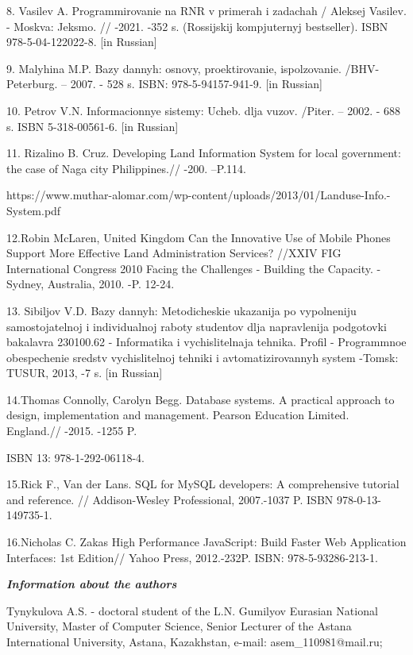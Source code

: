 8. Vasil\textquotesingle ev A. Programmirovanie na RNR v primerah i
zadachah / Aleksej Vasil\textquotesingle ev. - Moskva: Jeksmo. // -2021.
-352 s. (Rossijskij komp\textquotesingle juternyj bestseller). ISBN
978-5-04-122022-8. {[}in Russian{]}

9. Malyhina M.P. Bazy dannyh: osnovy, proektirovanie,
ispol\textquotesingle zovanie. /BHV-Peterburg. -- 2007. - 528 s. ISBN:
978-5-94157-941-9. {[}in Russian{]}

10. Petrov V.N. Informacionnye sistemy: Ucheb. dlja vuzov. /Piter. --
2002. - 688 s. ISBN 5-318-00561-6. {[}in Russian{]}

11. Rizalino B. Cruz. Developing Land Information System for local
government: the case of Naga city Philippines.// -200. --P.114.

https://www.muthar-alomar.com/wp-content/uploads/2013/01/Landuse-Info.-System.pdf

12.Robin McLaren, United Kingdom Can the Innovative Use of Mobile Phones
Support More Effective Land Administration Services? //XXIV FIG
International Congress 2010 Facing the Challenges - Building the
Capacity. - Sydney, Australia, 2010. -P. 12-24.

13. Sibiljov V.D. Bazy dannyh: Metodicheskie ukazanija po vypolneniju
samostojatel\textquotesingle noj i individual\textquotesingle noj raboty
studentov dlja napravlenija podgotovki bakalavra 230100.62 - Informatika
i vychislitel\textquotesingle naja tehnika. Profil\textquotesingle{} -
Programmnoe obespechenie sredstv vychislitel\textquotesingle noj tehniki
i avtomatizirovannyh system -Tomsk: TUSUR, 2013, -7 s. {[}in Russian{]}

14.Thomas Connolly, Carolyn Begg. Database systems. A practical approach
to design, implementation and management. Pearson Education Limited.
England.// -2015. -1255 P.

ISBN 13: 978-1-292-06118-4.

15.Rick F., Van der Lans. SQL for MySQL developers: A comprehensive
tutorial and reference. // Addison-Wesley Professional, 2007.-1037 P.
ISBN 978-0-13-149735-1.

16.Nicholas C. Zakas High Performance JavaScript: Build Faster Web
Application Interfaces: 1st Edition// Yahoo Press, 2012.-232P. ISBN:
978-5-93286-213-1.

\emph{{\bfseries Information about the authors}}

Tynykulova A.S. - doctoral student of the L.N. Gumilyov Eurasian
National University, Master of Computer Science, Senior Lecturer of the
Astana International University, Astana, Kazakhstan, e-mail:
asem\_110981@mail.ru;

